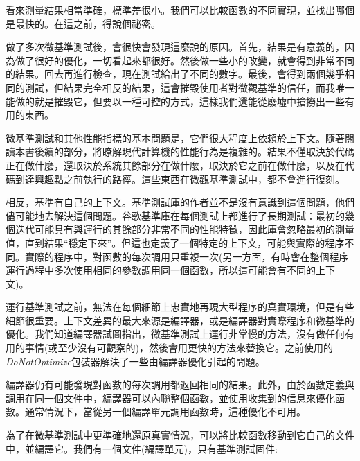 看來測量結果相當準確，標準差很小。我們可以比較函數的不同實現，並找出哪個是最快的。在這之前，得說個祕密。


做了多次微基準測試後，會很快會發現這麼說的原因。首先，結果是有意義的，因為做了很好的優化，一切看起來都很好。然後做一些小的改變，就會得到非常不同的結果。回去再進行檢查，現在測試給出了不同的數字。最後，會得到兩個幾乎相同的測試，但結果完全相反的結果，這會摧毀使用者對微觀基準的信任，而我唯一能做的就是摧毀它，但要以一種可控的方式，這樣我們還能從廢墟中搶撈出一些有用的東西。

微基準測試和其他性能指標的基本問題是，它們很大程度上依賴於上下文。隨著閱讀本書後續的部分，將瞭解現代計算機的性能行為是複雜的。結果不僅取決於代碼正在做什麼，還取決於系統其餘部分在做什麼，取決於它之前在做什麼，以及在代碼到達興趣點之前執行的路徑。這些東西在微觀基準測試中，都不會進行復刻。

相反，基準有自己的上下文。基準測試庫的作者並不是沒有意識到這個問題，他們儘可能地去解決這個問題。谷歌基準庫在每個測試上都進行了長期測試：最初的幾個迭代可能具有與運行的其餘部分非常不同的性能特徵，因此庫會忽略最初的測量值，直到結果“穩定下來”。但這也定義了一個特定的上下文，可能與實際的程序不同。實際的程序中，對函數的每次調用只重複一次(另一方面，有時會在整個程序運行過程中多次使用相同的參數調用同一個函數，所以這可能會有不同的上下文)。

運行基準測試之前，無法在每個細節上忠實地再現大型程序的真實環境，但是有些細節很重要。上下文差異的最大來源是編譯器，或是編譯器對實際程序和微基準的優化。我們知道編譯器試圖指出，微基準測試上運行非常慢的方法，沒有做任何有用的事情(或至少沒有可觀察的)，然後會用更快的方法來替換它。之前使用的\textit{DoNotOptimize}包裝器解決了一些由編譯器優化引起的問題。

編譯器仍有可能發現對函數的每次調用都返回相同的結果。此外，由於函數定義與調用在同一個文件中，編譯器可以內聯整個函數，並使用收集到的信息來優化函數。通常情況下，當從另一個編譯單元調用函數時，這種優化不可用。

為了在微基準測試中更準確地還原真實情況，可以將比較函數移動到它自己的文件中，並編譯它。我們有一個文件(編譯單元)，只有基準測試固件:

